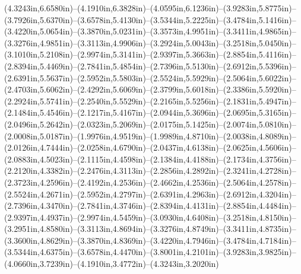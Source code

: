 (4.3243in,6.6580in)--(4.1910in,6.3828in)--(4.0595in,6.1236in)--(3.9283in,5.8775in)--(3.7926in,5.6370in)--(3.6578in,5.4130in)--(3.5344in,5.2225in)--(3.4784in,5.1416in)--(3.4220in,5.0654in)--(3.3870in,5.0231in)--(3.3573in,4.9951in)--(3.3411in,4.9865in)--(3.3276in,4.9851in)--(3.3113in,4.9906in)--(3.2924in,5.0043in)--(3.2518in,5.0450in)--(3.1010in,5.2108in)--(2.9974in,5.3141in)--(2.9397in,5.3663in)--(2.8854in,5.4116in)--(2.8394in,5.4469in)--(2.7841in,5.4854in)--(2.7396in,5.5130in)--(2.6912in,5.5396in)--(2.6391in,5.5637in)--(2.5952in,5.5803in)--(2.5524in,5.5929in)--(2.5064in,5.6022in)--(2.4703in,5.6062in)--(2.4292in,5.6069in)--(2.3799in,5.6018in)--(2.3386in,5.5920in)--(2.2924in,5.5741in)--(2.2540in,5.5529in)--(2.2165in,5.5256in)--(2.1831in,5.4947in)--(2.1484in,5.4546in)--(2.1217in,5.4167in)--(2.0944in,5.3696in)--(2.0695in,5.3165in)--(2.0496in,5.2642in)--(2.0323in,5.2069in)--(2.0175in,5.1425in)--(2.0074in,5.0810in)--(2.0008in,5.0187in)--(1.9976in,4.9519in)--(1.9989in,4.8710in)--(2.0038in,4.8089in)--(2.0126in,4.7444in)--(2.0258in,4.6790in)--(2.0437in,4.6138in)--(2.0625in,4.5606in)--(2.0883in,4.5023in)--(2.1115in,4.4598in)--(2.1384in,4.4188in)--(2.1734in,4.3756in)--(2.2120in,4.3382in)--(2.2476in,4.3113in)--(2.2856in,4.2892in)--(2.3241in,4.2728in)--(2.3723in,4.2596in)--(2.4192in,4.2536in)--(2.4662in,4.2536in)--(2.5064in,4.2578in)--(2.5524in,4.2671in)--(2.5952in,4.2797in)--(2.6391in,4.2963in)--(2.6912in,4.3204in)--(2.7396in,4.3470in)--(2.7841in,4.3746in)--(2.8394in,4.4131in)--(2.8854in,4.4484in)--(2.9397in,4.4937in)--(2.9974in,4.5459in)--(3.0930in,4.6408in)--(3.2518in,4.8150in)--(3.2951in,4.8580in)--(3.3113in,4.8694in)--(3.3276in,4.8749in)--(3.3411in,4.8735in)--(3.3600in,4.8629in)--(3.3870in,4.8369in)--(3.4220in,4.7946in)--(3.4784in,4.7184in)--(3.5344in,4.6375in)--(3.6578in,4.4470in)--(3.8001in,4.2101in)--(3.9283in,3.9825in)--(4.0660in,3.7239in)--(4.1910in,3.4772in)--(4.3243in,3.2020in)
